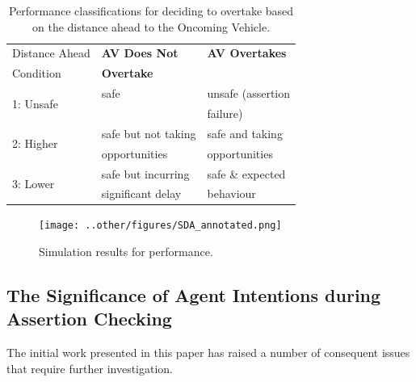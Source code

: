 \begin{table}[]
\centering
\begin{tabular}{|p{2.3cm}|p{2.3cm}|p{2.3cm}|}
\hline
\multicolumn{1}{|l|}{Distance Ahead} & \multicolumn{1}{l|}{\textbf{AV Does Not }} & \multicolumn{1}{l|}{\textbf{AV Overtakes}} \\ 
Condition & \textbf{Overtake} & \\
\hline
\multirow{2}{*}{1: Unsafe} & safe & unsafe (assertion \\
& & failure) \\
\hline
\multirow{2}{*}{2: Higher} & safe but not taking & safe and taking\\ 
      Performance & opportunities & opportunities\\
\hline
\multirow{2}{*}{3: Lower} & safe but incurring  & safe \& expected  \\ 
Performance & significant delay & behaviour\\
\hline
\end{tabular}
\caption{Performance classifications for deciding to overtake based on the distance ahead to the Oncoming Vehicle.}
\label{performance_metric_table}
\end{table}


\begin{figure}[ht!]
    \centering
    \texttt{[image: ..other/figures/SDA\_annotated.png]}
    \caption{Simulation results for performance.}
    \label{fig:performance_results}
\end{figure}

\subsection{The Significance of Agent Intentions during Assertion Checking} %
The initial work presented in this paper has raised a number of consequent issues that require further investigation.

